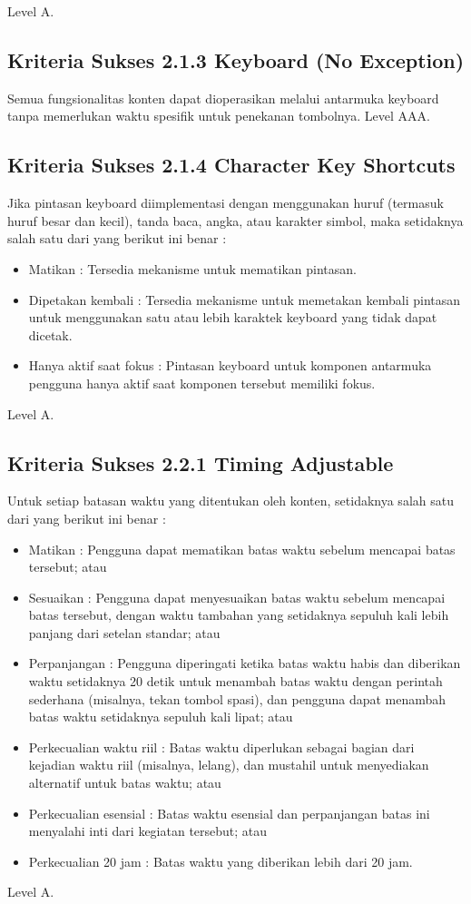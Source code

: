Level A.

\subsection{Kriteria Sukses 2.1.3 Keyboard (No Exception)}
\label{sec:kriteria_2.1.3}
Semua fungsionalitas konten dapat dioperasikan melalui antarmuka keyboard tanpa memerlukan waktu spesifik untuk penekanan tombolnya.
Level AAA.

\subsection{Kriteria Sukses 2.1.4 Character Key Shortcuts}
\label{sec:kriteria_2.1.4}
Jika pintasan keyboard diimplementasi dengan menggunakan huruf (termasuk huruf besar dan kecil), tanda baca, angka, atau karakter simbol, maka setidaknya salah satu dari yang berikut ini benar :

\begin{itemize}
	\item Matikan : Tersedia mekanisme untuk mematikan pintasan.
	\item Dipetakan kembali : Tersedia mekanisme untuk memetakan kembali pintasan untuk menggunakan satu atau lebih karaktek keyboard yang tidak dapat dicetak.
	\item Hanya aktif saat fokus : Pintasan keyboard untuk komponen antarmuka pengguna hanya aktif saat komponen tersebut memiliki fokus.
\end{itemize}

Level A.

\subsection{Kriteria Sukses 2.2.1 Timing Adjustable}
\label{sec:kriteria_2.2.1}
Untuk setiap batasan waktu yang ditentukan oleh konten, setidaknya salah satu dari yang berikut ini benar :

\begin{itemize}
	\item Matikan : Pengguna dapat mematikan batas waktu sebelum mencapai batas tersebut; atau
	\item Sesuaikan : Pengguna dapat menyesuaikan batas waktu sebelum mencapai batas tersebut, dengan waktu tambahan yang setidaknya sepuluh kali lebih panjang dari setelan standar; atau
	\item Perpanjangan : Pengguna diperingati ketika batas waktu habis dan diberikan waktu setidaknya 20 detik untuk menambah batas waktu dengan perintah sederhana (misalnya, tekan tombol spasi), dan pengguna dapat menambah batas waktu setidaknya sepuluh kali lipat; atau
	\item Perkecualian waktu riil : Batas waktu diperlukan sebagai bagian dari kejadian waktu riil (misalnya, lelang), dan mustahil untuk menyediakan alternatif untuk batas waktu; atau
	\item Perkecualian esensial : Batas waktu esensial dan perpanjangan batas ini menyalahi inti dari kegiatan tersebut; atau
	\item Perkecualian 20 jam : Batas waktu yang diberikan lebih dari 20 jam.
\end{itemize}
Level A.

